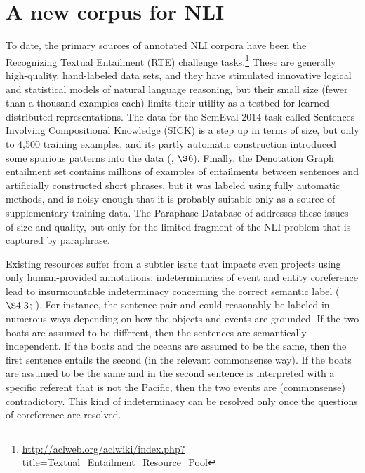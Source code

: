 
\section{A new corpus for NLI}\label{sec:discussion}

To date, the primary sources of annotated NLI corpora have been the
Recognizing Textual Entailment (RTE)
challenge tasks.\footnote{\url{http://aclweb.org/aclwiki/index.php?title=Textual_Entailment_Resource_Pool}}
These are generally high-quality, hand-labeled data sets, and they
have stimulated innovative logical and statistical models of natural
language reasoning, but their small size (fewer than a thousand examples each)
limits their utility as a testbed for learned distributed representations. 
The data for the SemEval 2014 task called Sentences Involving Compositional Knowledge (SICK) is a
step up in terms of size, but only to 4,500 training examples, and its
partly automatic construction introduced some spurious patterns into
the data (\citealt{marelli2014semeval}, $\S$6). Finally, the
Denotation Graph entailment set \cite{hodoshimage} contains millions of
examples of entailments between sentences and artificially constructed
short phrases, but it was labeled using fully automatic methods, and is
noisy enough that it is probably suitable only as a source of
supplementary training data. The Paraphase Database of 
addresses these issues of size and quality, but only for the limited
fragment of the NLI problem that is captured by paraphrase.

Existing resources suffer from a subtler issue that impacts even
projects using only human-provided annotations: indeterminacies of
event and entity coreference lead to insurmountable indeterminacy
concerning the correct semantic label (\citealt{de2008finding} $\S4.3$; \citealt{marelli2014sick}). For
instance, the sentence pair  and  could reasonably be labeled in
numerous ways depending on how the objects and events are grounded. If
the two boats are assumed to be different, then the sentences are semantically
independent. If the boats and the oceans are assumed to be the same,
then the first sentence entails the second (in the relevant
commonsense way). If the boats are assumed to be the same and 
 in the second sentence is interpreted with a specific referent 
that is not the Pacific, then the two events are (commonsense) contradictory. This
kind of indeterminacy can be resolved only once the questions of
coreference are resolved.


